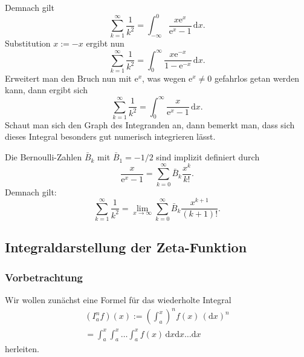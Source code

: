 \documentclass[a4paper,10pt,fleqn,twocolumn,twoside,dvipdfmx]{scrartcl}
\numberwithin{equation}{section}
\newcommand{\ee}{\mathrm e}
\theoremstyle{rmbox}
\begin{document}
Demnach gilt
\begin{equation}
\sum_{k=1}^\infty\frac{1}{k^2}
= \int_{-\infty}^0 \frac{x\ee^x}{\ee^x-1}\,\mathrm dx.
\end{equation}
Substitution $x:=-x$ ergibt nun
\begin{equation}
\sum_{k=1}^\infty\frac{1}{k^2}
= \int_0^\infty \frac{x\ee^{-x}}{1-\ee^{-x}}\,\mathrm dx.
\end{equation}
Erweitert man den Bruch nun mit $\ee^x$, was wegen $\ee^x\ne 0$
gefahrlos getan werden kann, dann ergibt sich%
\begin{equation}
\sum_{k=1}^\infty\frac{1}{k^2}
= \int_0^\infty \frac{x}{\ee^x-1}\,\mathrm dx.
\end{equation}
Schaut man sich den Graph des Integranden an, dann bemerkt man,
dass sich dieses Integral besonders gut numerisch integrieren
lässt.

Die Bernoulli-Zahlen $\bar B_k$ mit $\bar B_1=-1/2$
sind implizit definiert durch%
\begin{equation}
\frac{x}{\ee^x-1} = \sum_{k=0}^\infty \bar B_k\frac{x^k}{k!}.
\end{equation}
Demnach gilt:
\begin{equation}
\sum_{k=1}^\infty\frac{1}{k^2}
= \lim_{x\to\infty}\sum_{k=0}^\infty \bar B_k\frac{x^{k+1}}{(k+1)!}.
\end{equation}

\subsection{Integraldarstellung der Zeta-Funktion}

\subsubsection{Vorbetrachtung}
Wir wollen zunächst eine Formel für das wiederholte Integral
\begin{gather}
(I_a^n f)(x) := \left(\int_a^x\right)^n f(x)\,(\mathrm dx)^n\\
= \int_a^x\int_a^x\ldots\int_a^x f(x)\,\mathrm dx\mathrm dx\ldots\mathrm dx
\end{gather}
herleiten.
\end{document}
